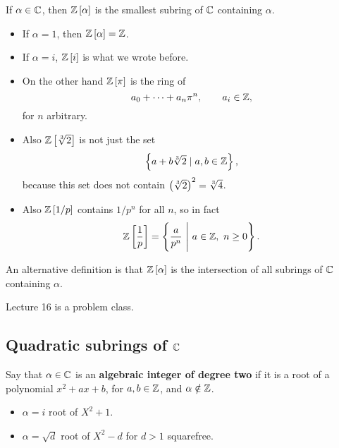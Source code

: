 \begin{definition}
If $ \alpha \in \mathbb{C} $, then $ \mathbb{Z}\left[ \alpha \right] $ is the smallest subring of $ \mathbb{C} $ containing $ \alpha $.
\end{definition}

\begin{example*}
\hfill
\begin{itemize}
\item If $ \alpha = 1 $, then $ \mathbb{Z}\left[ \alpha \right] = \mathbb{Z} $.
\item If $ \alpha = i $, $ \mathbb{Z}\left[ i \right] $ is what we wrote before.
\item On the other hand $ \mathbb{Z}\left[ \pi \right] $ is the ring of
$$ a_0 + \dots + a_n\pi^n, \qquad a_i \in \mathbb{Z}, $$
for $ n $ arbitrary.
\item Also $ \mathbb{Z}\left[ \sqrt[3]{2} \right] $ is not just the set
$$ \left\{ a + b\sqrt[3]{2} \mid a, b \in \mathbb{Z} \right\}, $$
because this set does not contain $ \left( \sqrt[3]{2} \right)^2 = \sqrt[3]{4} $.
\item Also $ \mathbb{Z}\left[ 1 / p \right] $ contains $ 1 / p^n $ for all $ n $, so in fact
$$ \mathbb{Z}\left[ \dfrac{1}{p} \right] = \left\{ \dfrac{a}{p^n} \ \Bigg| \ a \in \mathbb{Z}, \ n \ge 0 \right\}. $$
\end{itemize}
\end{example*}

An alternative definition is that $ \mathbb{Z}\left[ \alpha \right] $ is the intersection of all subrings of $ \mathbb{C} $ containing $ \alpha $.


Lecture 16 is a problem class.


\subsection{Quadratic subrings of $ \mathbb{C} $}

\begin{definition}
Say that $ \alpha \in \mathbb{C} $ is an \textbf{algebraic integer of degree two} if it is a root of a polynomial $ x^2 + ax + b $, for $ a, b \in \mathbb{Z} $, and $ \alpha \notin \mathbb{Z} $.
\end{definition}

\begin{example*}
\hfill
\begin{itemize}
\item $ \alpha = i $ root of $ X^2 + 1 $.
\item $ \alpha = \sqrt{d} $ root of $ X^2 - d $ for $ d > 1 $ squarefree.
\end{itemize}
\end{example*}

